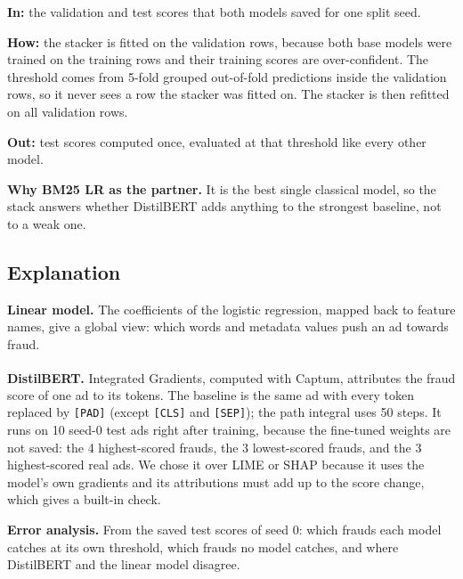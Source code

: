 \textbf{In:} the validation and test scores that both models saved for one split seed.

\textbf{How:} the stacker is fitted on the validation rows, because both base models were trained
on the training rows and their training scores are over-confident. The threshold comes from 5-fold
grouped out-of-fold predictions inside the validation rows, so it never sees a row the stacker was
fitted on. The stacker is then refitted on all validation rows.

\textbf{Out:} test scores computed once, evaluated at that threshold like every other model.

\textbf{Why BM25 LR as the partner.} It is the best single classical model, so the stack answers
whether DistilBERT adds anything to the strongest baseline, not to a weak one.

\subsection{Explanation}

\textbf{Linear model.} The coefficients of the logistic regression, mapped back to feature names,
give a global view: which words and metadata values push an ad towards fraud.

\textbf{DistilBERT.} Integrated Gradients\textsuperscript{\cite{sundararajan2017}}, computed with
Captum\textsuperscript{\cite{kokhlikyan2020}}, attributes the fraud score of one ad to its tokens. The
baseline is the same ad with every token replaced by \texttt{[PAD]} (except \texttt{[CLS]} and
\texttt{[SEP]}); the path integral uses 50 steps. It runs on 10 seed-0 test ads right after
training, because the fine-tuned weights are not saved: the 4 highest-scored frauds, the 3
lowest-scored frauds, and the 3 highest-scored real ads. We chose it over LIME or SHAP because it
uses the model's own gradients and its attributions must add up to the score change, which gives a
built-in check.

\textbf{Error analysis.} From the saved test scores of seed 0: which frauds each model catches at
its own threshold, which frauds no model catches, and where DistilBERT and the linear model
disagree.
